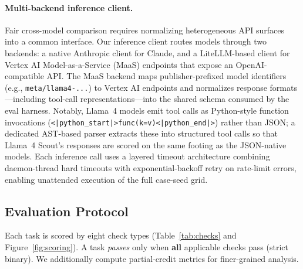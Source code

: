 \documentclass[10pt,twocolumn]{article}
\begin{document}
\paragraph{Multi-backend inference client.}
Fair cross-model comparison requires normalizing heterogeneous API surfaces into a common interface. Our inference client routes models through two backends: a native Anthropic client for Claude, and a LiteLLM-based client for Vertex AI Model-as-a-Service (MaaS) endpoints that expose an OpenAI-compatible API. The MaaS backend maps publisher-prefixed model identifiers (e.g., \texttt{meta/llama4-...}) to Vertex AI endpoints and normalizes response formats---including tool-call representations---into the shared schema consumed by the eval harness. Notably, Llama~4 models emit tool calls as Python-style function invocations (\texttt{<|python\_start|>func(k=v)<|python\_end|>}) rather than JSON; a dedicated AST-based parser extracts these into structured tool calls so that Llama~4 Scout's responses are scored on the same footing as the JSON-native models. Each inference call uses a layered timeout architecture combining daemon-thread hard timeouts with exponential-backoff retry on rate-limit errors, enabling unattended execution of the full case-seed grid.

\subsection{Evaluation Protocol}
\label{sec:scoring}

Each task is scored by eight check types (Table~\ref{tab:checks} and Figure~\ref{fig:scoring}). A task \emph{passes} only when \textbf{all} applicable checks pass (strict binary). We additionally compute partial-credit metrics for finer-grained analysis.
\end{document}
